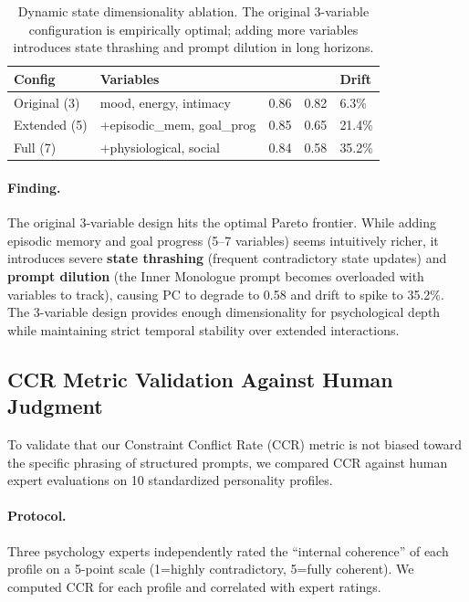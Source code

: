 \documentclass[11pt]{article}
\begin{document}
\begin{CJK*}{UTF8}{gbsn}
\begin{table}[h]
\centering
\small
\setlength{\tabcolsep}{4pt}
\renewcommand{\arraystretch}{1.12}
\begin{tabular}{L{0.18\columnwidth}L{0.34\columnwidth}C{0.12\columnwidth}C{0.12\columnwidth}C{0.10\columnwidth}}
\toprule
\textbf{Config} & \textbf{Variables} & \textbf{} & \textbf{} & \textbf{Drift} \\
\midrule
Original (3) & mood, energy, intimacy & 0.86 & 0.82 & 6.3\% \\
Extended (5) & +episodic\_mem, goal\_prog & 0.85 & 0.65 & 21.4\% \\
Full (7) & +physiological, social & 0.84 & 0.58 & 35.2\% \\
\bottomrule
\end{tabular}
\caption{Dynamic state dimensionality ablation. The original 3-variable configuration is empirically optimal; adding more variables introduces state thrashing and prompt dilution in long horizons.}
\label{tab:extended_state}
\end{table}

\paragraph{Finding.} The original 3-variable design hits the optimal Pareto frontier. While adding episodic memory and goal progress (5--7 variables) seems intuitively richer, it introduces severe \textbf{state thrashing} (frequent contradictory state updates) and \textbf{prompt dilution} (the Inner Monologue prompt becomes overloaded with variables to track), causing PC to degrade to 0.58 and drift to spike to 35.2\%. The 3-variable design provides enough dimensionality for psychological depth while maintaining strict temporal stability over extended interactions.

\subsection{CCR Metric Validation Against Human Judgment}
\label{sec:ccr_validation}

To validate that our Constraint Conflict Rate (CCR) metric is not biased toward the specific phrasing of structured prompts, we compared CCR against human expert evaluations on 10 standardized personality profiles.

\paragraph{Protocol.} Three psychology experts independently rated the ``internal coherence'' of each profile on a 5-point scale (1=highly contradictory, 5=fully coherent). We computed CCR for each profile and correlated with expert ratings.


\end{CJK*}
\end{document}
